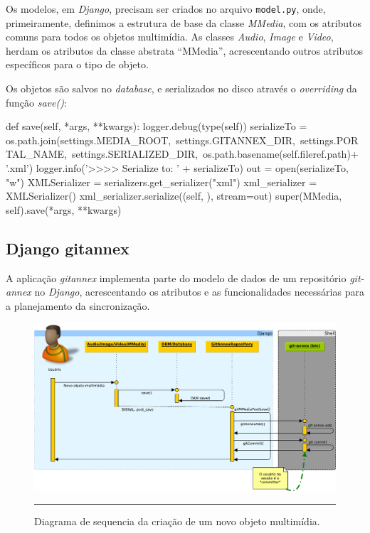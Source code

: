 Os modelos, em \emph{Django}, precisam ser criados no arquivo \verb|model.py|,
onde, primeiramente, definimos a estrutura de base da classe
\emph{MMedia}, com os atributos comuns para todos os objetos
multimídia. As classes \emph{Audio}, \emph{Image} e \emph{Video},
herdam os atributos da classe abstrata ``MMedia'', acrescentando outros
atributos específicos para o tipo de objeto.

Os objetos são salvos no \emph{database}, e serializados no disco
através o \emph{overriding} da função \emph{save()}:

\begin{code}
    def save(self, *args, **kwargs):
        logger.debug(type(self))
        serializeTo = os.path.join(settings.MEDIA_ROOT,\
                                   settings.GITANNEX_DIR,\
                                   settings.PORTAL_NAME,\
                                   settings.SERIALIZED_DIR,\
                                   os.path.basename(self.fileref.path)+ '.xml')
        logger.info('>>>> Serialize to: ' + serializeTo)
        out = open(serializeTo, "w")
        XMLSerializer = serializers.get_serializer("xml")
        xml_serializer = XMLSerializer()
        xml_serializer.serialize((self, ), stream=out)
        super(MMedia, self).save(*args, **kwargs)
\end{code}


\subsection{Django gitannex}

A aplicação \emph{gitannex} implementa parte do modelo de dados de um
repositório \emph{git-annex} no \emph{Django}, acrescentando os
atributos e as funcionalidades necessárias para a planejamento da
sincronização.

\begin{figure}[htbp]
  \centering
  \includegraphics[width=\textwidth]{./Figure/SequenceDiagram_NuovoOggetto-crop.pdf}
  \rule{35em}{0.5pt}
  \caption[Diagrama de sequencia da criação de um novo objeto
  multimídia]{Diagrama de sequencia da criação de um novo objeto
    multimídia.}
  \label{fig:SequenceDiagramAdd}
\end{figure}

